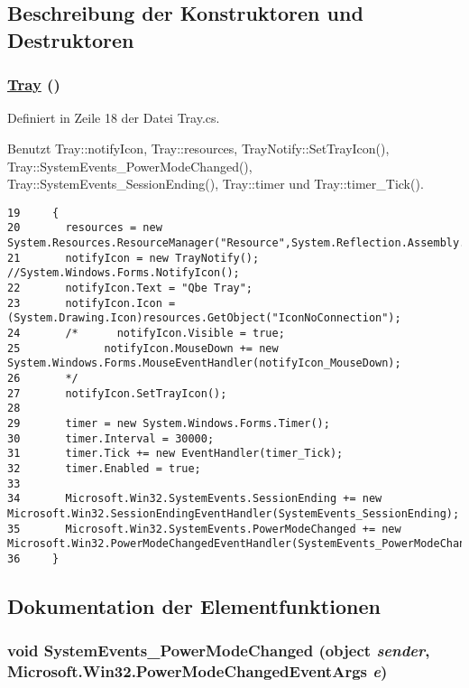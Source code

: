 \subsection{Beschreibung der Konstruktoren und Destruktoren}
\hypertarget{classQbeTray_1_1Tray_QbeTray_1_1Traya0}{
\subsubsection[Tray]{\setlength{\rightskip}{0pt plus 5cm}\hyperlink{classQbeTray_1_1Tray}{Tray} ()}}
\label{classQbeTray_1_1Tray_QbeTray_1_1Traya0}




Definiert in Zeile 18 der Datei Tray.cs.

Benutzt Tray::notify\-Icon, Tray::resources, Tray\-Notify::Set\-Tray\-Icon(), Tray::System\-Events\_\-Power\-Mode\-Changed(), Tray::System\-Events\_\-Session\-Ending(), Tray::timer und Tray::timer\_\-Tick().



\footnotesize\begin{verbatim}19     {
20       resources = new System.Resources.ResourceManager("Resource",System.Reflection.Assembly.GetExecutingAssembly());
21       notifyIcon = new TrayNotify(); //System.Windows.Forms.NotifyIcon();
22       notifyIcon.Text = "Qbe Tray";
23       notifyIcon.Icon = (System.Drawing.Icon)resources.GetObject("IconNoConnection");
24       /*      notifyIcon.Visible = true;
25             notifyIcon.MouseDown += new System.Windows.Forms.MouseEventHandler(notifyIcon_MouseDown);
26       */  
27       notifyIcon.SetTrayIcon();
28 
29       timer = new System.Windows.Forms.Timer();
30       timer.Interval = 30000;
31       timer.Tick += new EventHandler(timer_Tick);
32       timer.Enabled = true;
33 
34       Microsoft.Win32.SystemEvents.SessionEnding += new Microsoft.Win32.SessionEndingEventHandler(SystemEvents_SessionEnding);
35       Microsoft.Win32.SystemEvents.PowerModeChanged += new Microsoft.Win32.PowerModeChangedEventHandler(SystemEvents_PowerModeChanged);
36     }
\end{verbatim}\normalsize 


\subsection{Dokumentation der Elementfunktionen}
\hypertarget{classQbeTray_1_1Tray_QbeTray_1_1Trayd2}{
\subsubsection[SystemEvents\_\-PowerModeChanged]{\setlength{\rightskip}{0pt plus 5cm}void System\-Events\_\-Power\-Mode\-Changed (object {\em sender}, Microsoft.Win32.Power\-Mode\-Changed\-Event\-Args {\em e})}}
\label{classQbeTray_1_1Tray_QbeTray_1_1Trayd2}




